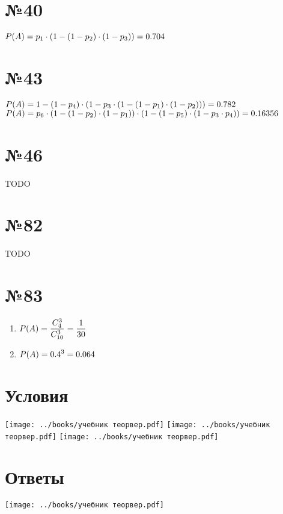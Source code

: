 \documentclass{article}
\newcommand{\hr}{\par\vspace{.5\baselineskip}\noindent\hrulefill\par}
\begin{document}
  \section*{№40}
  $\displaystyle P(A) = p_1 \cdot \left(1 - \left(1 - p_2\right)\cdot\left(1 - p_3\right)\right) = 0.704$

  \section*{№43}
  $\displaystyle P(A) = 1 - \left(1 - p_4\right)\cdot\left(1 - p_3 \cdot \left(1 - \left(1 - p_1\right)\cdot\left(1 - p_2\right)\right)\right) = 0.782$ \\
  $\displaystyle P(A) = p_6 \cdot \left(1 - \left(1 - p_2\right)\cdot\left(1 - p_1\right)\right) \cdot \left(1 - \left(1 - p_5\right)\cdot\left(1 - p_3\cdot p_4\right)\right) = 0.16356$

  \section*{№46}
  TODO

  \section*{№82}
  TODO

  \section*{№83}
  \begin{enumerate}[label=\realasbuk*)]
    \item $\displaystyle P(A) = \frac{C^3_4}{C^3_{10}} = \frac{1}{30}$
    \item $\displaystyle P(A) = 0.4^3 = 0.064$
  \end{enumerate}

  \hr
  \section*{Условия}
  \texttt{[image: ../books/учебник теорвер.pdf]} \hfill
  \texttt{[image: ../books/учебник теорвер.pdf]} \hfill
  \texttt{[image: ../books/учебник теорвер.pdf]} \hfill

  \section*{Ответы}
  \begin{center}
    \texttt{[image: ../books/учебник теорвер.pdf]}
  \end{center}
\end{document}
